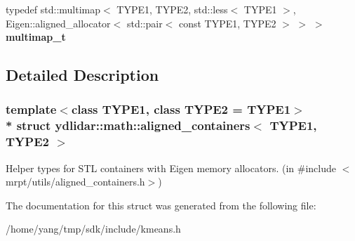 \begin{DoxyCompactItemize}
\item 
typedef std\+::multimap$<$ T\+Y\+P\+E1, T\+Y\+P\+E2, std\+::less$<$ T\+Y\+P\+E1 $>$, Eigen\+::aligned\+\_\+allocator$<$ std\+::pair$<$ const T\+Y\+P\+E1, T\+Y\+P\+E2 $>$ $>$ $>$ {\bfseries multimap\+\_\+t}\hypertarget{structydlidar_1_1math_1_1aligned__containers_acaa5b890b2477258b989b1724205c953}{}\label{structydlidar_1_1math_1_1aligned__containers_acaa5b890b2477258b989b1724205c953}

\end{DoxyCompactItemize}


\subsection{Detailed Description}
\subsubsection*{template$<$class T\+Y\+P\+E1, class T\+Y\+P\+E2 = T\+Y\+P\+E1$>$\\*
struct ydlidar\+::math\+::aligned\+\_\+containers$<$ T\+Y\+P\+E1, T\+Y\+P\+E2 $>$}

Helper types for S\+TL containers with Eigen memory allocators. (in \#include $<$mrpt/utils/aligned\+\_\+containers.\+h$>$) 

The documentation for this struct was generated from the following file\+:\begin{DoxyCompactItemize}
\item 
/home/yang/tmp/sdk/include/kmeans.\+h\end{DoxyCompactItemize}
